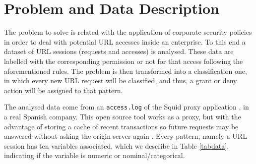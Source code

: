 \documentclass{llncs}
\begin{document}
%

\section{Problem and Data Description} 
\label{sec:problemDescription}

\noindent The problem to solve is related with the application of corporate security policies in order to deal with potential URL accesses inside an enterprise. To this end a dataset of URL sessions (requests and accesses) is analysed. These data are labelled with the corresponding permission or not for that access following the aforementioned rules. The problem is then transformed into a classification one, in which every new URL request will be classified, and thus, a grant or deny action will be assigned to that pattern.

The analysed data come from an \texttt{access.log} of the Squid
proxy application
\cite{squid:site}, in a real Spanish company. This open source tool
works as a proxy, but with the advantage of storing a cache of recent
transactions so future requests may be answered without asking the
origin server again \cite{DuaneWessels2004}.  
Every pattern, namely a URL session has ten variables associated,
which we describe in Table \ref{tabdata}, indicating if the variable
is numeric or nominal/categorical. 
\end{document}
